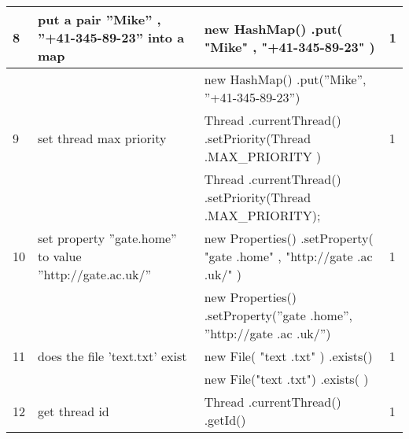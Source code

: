 \begin{longtable}{|p{}|p{}|p{}|p{}|}
		\rowcolor[HTML]{FFCCC9} 
		8                                 & put a pair ”Mike” , ”+41-345-89-23” into a map         & new HashMap() .put( "Mike" , "+41-345-89-23" )                                                                   & 1                                       \\ \hline
		\rowcolor[HTML]{9AFF99} 
		&                                                        & new HashMap() .put(”Mike”, ”+41-345-89-23”)                                                                      &                                         \\ \hline
		\rowcolor[HTML]{FFCCC9} 
		9                                 & set thread max priority                                & Thread .currentThread() .setPriority(Thread .MAX\_PRIORITY )                                                     & 1                                       \\ \hline
		\rowcolor[HTML]{9AFF99} 
		&                                                        & Thread .currentThread() .setPriority(Thread .MAX\_PRIORITY);                                                     &                                         \\ \hline
		\rowcolor[HTML]{FFCCC9} 
		10                                & set property ”gate.home” to value ”http://gate.ac.uk/” & new Properties() .setProperty( "gate .home" , "http://gate .ac .uk/" )                                           & 1                                       \\ \hline
		\rowcolor[HTML]{9AFF99} 
		&                                                        & new Properties() .setProperty(”gate .home”, ”http://gate .ac .uk/”)                                              &                                         \\ \hline
		\rowcolor[HTML]{FFCCC9} 
		11                                & does the file 'text.txt' exist                         & new File( "text .txt" )  .exists()                                                                               & 1                                       \\ \hline
		\rowcolor[HTML]{9AFF99} 
		&                                                        & new File("text .txt") .exists( )                                                                                 &                                         \\ \hline
		\rowcolor[HTML]{FFCCC9} 
		12                                & get thread id                                          & Thread .currentThread() .getId()                                                                                 & 1                                       \\ \hline

\end{longtable}
